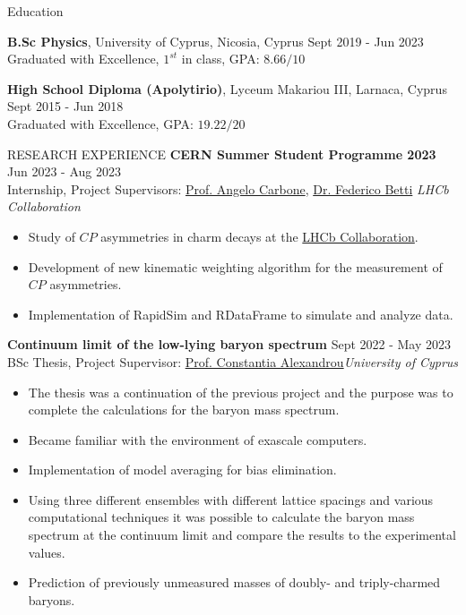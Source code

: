 \documentclass{resume} %
\begin{document}
\begin{rSection}{Education}

{\bf B.Sc Physics}, University of Cyprus, Nicosia, Cyprus \hfill {Sept 2019 - Jun 2023}\\
Graduated with Excellence, $1^{st}$ in class, GPA: $8.66/10$

{\bf High School Diploma (Apolytirio)}, Lyceum Makariou III, Larnaca, Cyprus \hfill {Sept 2015 - Jun 2018}\\
Graduated with Excellence, GPA: $19.22/20$
\end{rSection}

\bigbreak

\begin{rSection}{RESEARCH EXPERIENCE}
\textbf{CERN Summer Student Programme 2023} \hfill Jun 2023 - Aug 2023\\
Internship, Project Supervisors: \href{https://www.unibo.it/sitoweb/angelo.carbone/en}{Prof. Angelo Carbone}, \href{https://www.ph.ed.ac.uk/people/federico-betti}{Dr. Federico Betti}
\hfill \textit{LHCb Collaboration}
\begin{itemize}
\itemsep -3pt {}
\item Study of $CP$ asymmetries in charm decays at the \href{https://lhcb.web.cern.ch/}{LHCb Collaboration}.
\item Development of new kinematic weighting algorithm for the measurement of $CP$ asymmetries.
\item Implementation of RapidSim and RDataFrame to simulate and analyze data.
\end{itemize}

\textbf{Continuum limit of the low-lying baryon spectrum} \hfill Sept 2022 - May 2023\\
BSc Thesis, Project Supervisor:  \href{https://www.cyi.ac.cy/index.php/castorc/about-the-center/castorc-our-people/itemlist/user/99-constantia-alexandrou.html}{Prof. Constantia Alexandrou}\hfill \textit{University of Cyprus}
\begin{itemize}
\itemsep -3pt {} 
\item The thesis was a continuation of the previous project and the purpose was to complete the calculations for the baryon mass spectrum.
\item Became familiar with the environment of exascale computers.
\item Implementation of model averaging for bias elimination.
\item Using three different ensembles with different lattice spacings and various computational techniques it was possible to calculate the baryon mass spectrum at the continuum limit and compare the results to the experimental values.
\item Prediction of previously unmeasured masses of doubly- and triply-charmed baryons.
\end{itemize}


\end{rSection}
\end{document}

